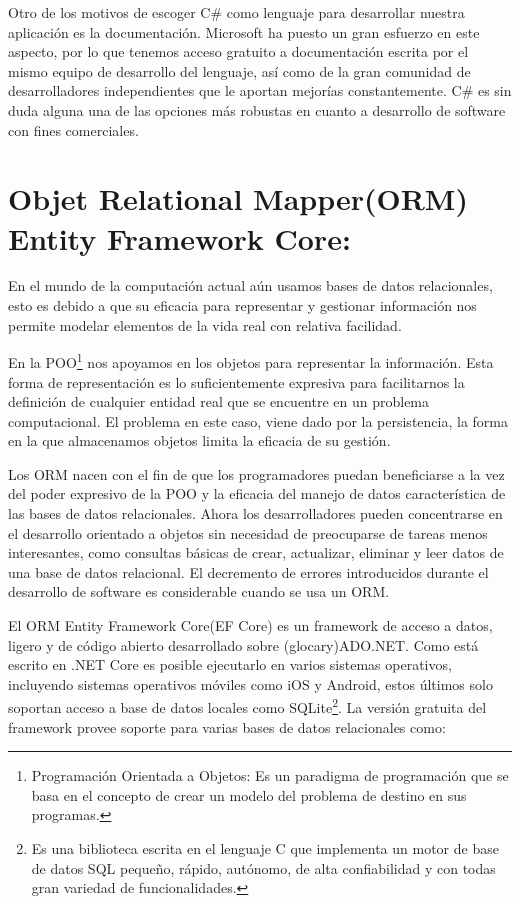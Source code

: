 Otro de los motivos de escoger C\# como lenguaje para desarrollar nuestra aplicación es la documentación. Microsoft ha puesto un gran esfuerzo en este aspecto, por lo que tenemos acceso gratuito a documentación escrita por el mismo equipo de desarrollo del lenguaje, así como de la gran comunidad de desarrolladores independientes que le aportan mejorías constantemente. C\# es sin duda alguna una de las opciones más robustas en cuanto a desarrollo de software con fines comerciales.

\section{Objet Relational Mapper(ORM) Entity Framework Core:}

En el mundo de la computación actual aún usamos bases de datos relacionales, esto es debido a que su eficacia para representar y gestionar información nos permite modelar elementos de la vida real con relativa facilidad.

En la POO\footnote{Programación Orientada a Objetos: Es un paradigma de programación que se basa en el concepto de crear un modelo del problema de destino en sus programas.} nos apoyamos en los objetos para representar la información. Esta forma de representación es lo suficientemente expresiva para facilitarnos la definición de cualquier entidad real que se encuentre en un problema computacional. El problema en este caso, viene dado por la persistencia, la forma en la que almacenamos objetos limita la eficacia de su gestión.
\newline

Los ORM nacen con el fin de que los programadores puedan beneficiarse a la vez del poder expresivo de la POO y la eficacia del manejo de datos característica de las bases de datos relacionales. Ahora los desarrolladores pueden concentrarse en el desarrollo orientado a objetos sin necesidad de preocuparse de tareas menos interesantes, como consultas básicas de crear, actualizar, eliminar y leer datos de una base de datos relacional. El decremento de errores  introducidos durante el desarrollo de software es considerable cuando se usa un ORM.
\newline

El ORM Entity Framework Core(EF Core) es un framework de acceso a datos, ligero y de código abierto desarrollado sobre (glocary)ADO.NET. Como está escrito en .NET Core es posible ejecutarlo en varios sistemas operativos, incluyendo sistemas operativos móviles como iOS y Android, estos últimos solo soportan acceso a base de datos locales como SQLite\footnote{Es una biblioteca escrita en el lenguaje C que implementa un motor de base de datos SQL pequeño, rápido, autónomo, de alta confiabilidad y con todas gran variedad de funcionalidades.}. La versión gratuita del framework provee soporte para varias bases de datos relacionales como:


